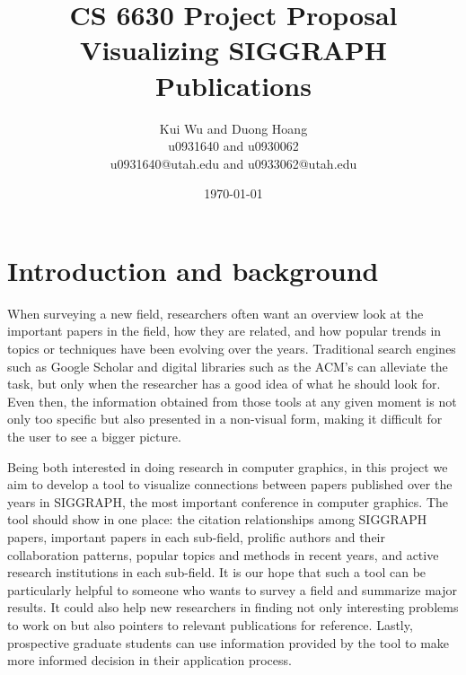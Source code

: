 \documentclass[dvips,12pt]{article}
\begin{document}

\title{CS 6630 Project Proposal\\Visualizing SIGGRAPH Publications}
\author{Kui Wu and Duong Hoang\\u0931640 and u0930062\\u0931640@utah.edu and u0933062@utah.edu}
\date{\today}



\maketitle

\section{Introduction and background}
When surveying a new field, researchers often want an overview look at the important papers in the field, how they are related, and how popular trends in topics or techniques have been evolving over the years. Traditional search engines such as Google Scholar and digital libraries such as the ACM's can alleviate the task, but only when the researcher has a good idea of what he should look for. Even then, the information obtained from those tools at any given moment is not only too specific but also presented in a non-visual form, making it difficult for the user to see a bigger picture.

Being both interested in doing research in computer graphics, in this project we aim to develop a tool to visualize connections between papers published over the years in SIGGRAPH, the most important conference in computer graphics. The tool should show in one place: the citation relationships among SIGGRAPH papers, important papers in each sub-field, prolific authors and their collaboration patterns, popular topics and methods in recent years, and active research institutions in each sub-field. It is our hope that such a tool can be particularly helpful to someone who wants to survey a field and summarize major results. It could also help new researchers in finding not only interesting problems to work on but also pointers to relevant publications for reference. Lastly, prospective graduate students can use information provided by the tool to make more informed decision in their application process.
\end{document}

